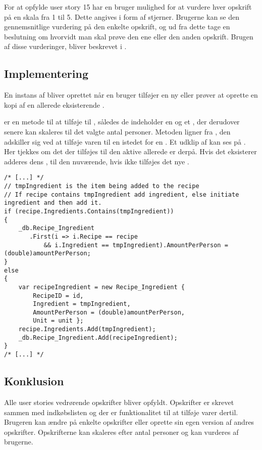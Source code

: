 For at opfylde user story 15 har en bruger mulighed for at vurdere hver opskrift på en skala fra 1 til 5.
Dette angives i form af stjerner.
Brugerne kan se den gennemsnitlige vurdering på den enkelte opskrift, og ud fra dette tage en beslutning om hvorvidt man skal prøve den ene eller den anden opskrift.
Brugen af disse vurderinger, bliver beskrevet i .

\subsection{Implementering}
En instans af  bliver oprettet når en bruger tilføjer en ny  eller prøver at oprette en kopi af en allerede eksisterende .

 er en metode til at tilføje  til , således de indeholder en  og et , der derudover senere kan skaleres til det valgte antal personer. 
Metoden ligner  fra , den adskiller sig ved at tilføje varen til en  istedet for en .
Et udklip af  kan ses på .
Her tjekkes om det  der tilføjes til den aktive  allerede er derpå. 
Hvis det eksisterer adderes dens , til den nuværende,
hvis ikke tilføjes det nye .



\begin{lstlisting}[caption={Udklip fra \class{AddIngredient}},label=addIngredient]
/* [...] */      
// tmpIngredient is the item being added to the recipe
// If recipe contains tmpIngredient add ingredient, else initiate ingredient and then add it.
if (recipe.Ingredients.Contains(tmpIngredient))
{
    _db.Recipe_Ingredient
       .First(i => i.Recipe == recipe 
       	   && i.Ingredient == tmpIngredient).AmountPerPerson = (double)amountPerPerson;
}
else
{
    var recipeIngredient = new Recipe_Ingredient { 
    	RecipeID = id, 
    	Ingredient = tmpIngredient, 
    	AmountPerPerson = (double)amountPerPerson, 
    	Unit = unit };
    recipe.Ingredients.Add(tmpIngredient);
    _db.Recipe_Ingredient.Add(recipeIngredient);
}
/* [...] */          
\end{lstlisting}


\subsection{Konklusion}
Alle user stories vedrørende opskrifter bliver opfyldt. 
Opskrifter er skrevet sammen med indkøbslisten og der er funktionalitet til at tilføje varer dertil. 
Brugeren kan ændre på enkelte opskrifter eller oprette sin egen version af andres opskrifter. 
Opskrifterne kan skaleres efter antal personer og kan vurderes af brugerne. 
